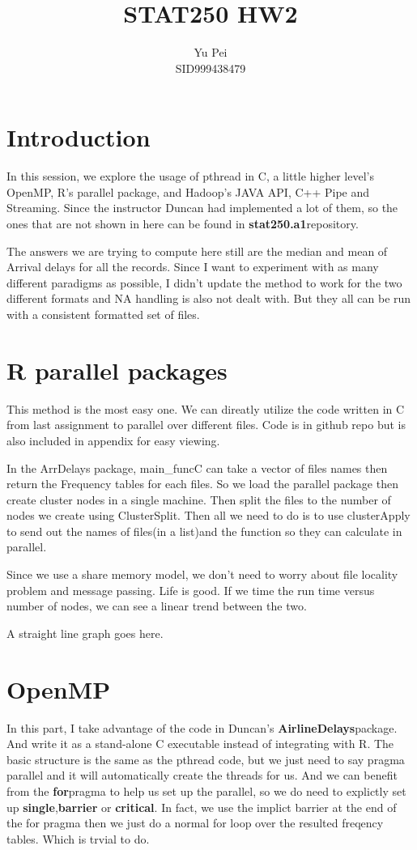 \documentclass[11pt]{article}
\begin{document}
\title{STAT250 HW2}
\author{Yu Pei\\ SID999438479}
\maketitle
\section{Introduction}
In this session, we explore the usage of pthread in C, a little higher level's OpenMP, R's parallel package, and Hadoop's JAVA API, C++ Pipe and Streaming. Since the instructor Duncan had implemented a lot of them, so the ones that are not shown in here can be found in \textbf{stat250.a1}repository. 

The answers we are trying to compute here still are the median and mean of Arrival delays for all the records. Since I want to experiment with as many different paradigms as possible, I didn't update the method to work for the two different formats and NA handling is also not dealt with. But they all can be run with a consistent formatted set of files.

\section{R parallel packages}
This method is the most easy one. We can direatly utilize the code written in C from last assignment to parallel over different files. Code is in github repo but is also included in appendix for easy viewing. 

In the ArrDelays package, main\_funcC can take a vector of files names then return the Frequency tables for each files. So we load the parallel package then create cluster nodes in a single machine. Then split the files to the number of nodes we create using ClusterSplit. Then all we need to do is to use clusterApply to send out the names of files(in a list)and the function so they can calculate in parallel.

Since we use a share memory model, we don't need to worry about file locality problem and message passing. Life is good. If we time the run time versus number of nodes, we can see a linear trend between the two. 

\vspace*{10 mm}

 A straight line graph goes here.
\section{OpenMP}
In this part, I take advantage of the code in Duncan's \textbf{AirlineDelays}package. And write it as a stand-alone C executable instead of integrating with R. The basic structure is the same as the pthread code, but we just need to say pragma parallel and it will automatically create the threads for us. And we can benefit from the \textbf{for}pragma to help us set up the parallel, so we do need to explictly set up  \textbf{single},\textbf{barrier} or \textbf{critical}. In fact, we use the implict barrier at the end of the for pragma then we just do a normal for loop over the resulted freqency tables. Which is trvial to do. 
\end{document}
